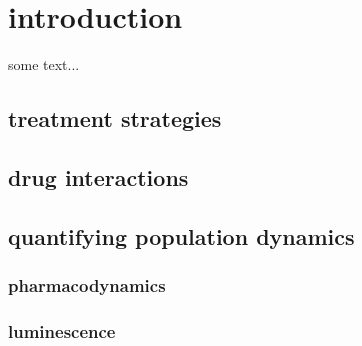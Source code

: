 \documentclass[../main.tex]{subfiles}
\begin{document}
    \chapter{introduction}
    some text... \cite{Kable1980, Delp1980, Skylakakis1981}

    \section{treatment strategies}

    \section{drug interactions}

    \section{quantifying population dynamics}

    \subsection{pharmacodynamics}

    \subsection{luminescence}

%
%
\end{document}
